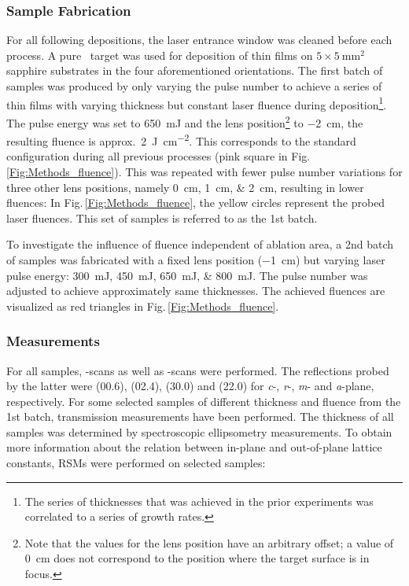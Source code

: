 \subsubsection{Sample Fabrication}
For all following depositions, the laser entrance window was cleaned before each process.
A pure \cro\ target was used for deposition of thin films on $5\times\qty{5}{\mm\squared}$ sapphire substrates in the four aforementioned orientations.
The first batch of samples was produced by only varying the pulse number to achieve a series of thin films with varying thickness but constant laser fluence during deposition\footnote{
    The series of thicknesses that was achieved in the prior experiments was correlated to a series of growth rates.
}.
The pulse energy was set to \qty{650}{\milli\joule} and the lens position\footnote{
    Note that the values for the lens position have an arbitrary offset; a value of \qty{0}{\cm} does not correspond to the position where the target surface is in focus.
}
to \qty{-2}{\cm}, the resulting fluence is approx.\ \qty{2}{\joule\per\cm\squared}.
This corresponds to the standard configuration during all previous processes (pink square in Fig.\,\ref{Fig:Methods_fluence}).
This was repeated with fewer pulse number variations for three other lens positions, namely \qtylist{0;1;2}{\cm}, resulting in lower fluences:
In Fig.\,\ref{Fig:Methods_fluence}, the yellow circles represent the probed laser fluences.
This set of samples is referred to as the 1st batch.

To investigate the influence of fluence independent of ablation area, a 2nd batch of samples was fabricated with a fixed lens position (\qty{-1}{\cm}) but varying laser pulse energy:
\qtylist{300;450;650;800}{\milli\joule}.
The pulse number was adjusted to achieve approximately same thicknesses.
The achieved fluences are visualized as red triangles in Fig.\,\ref{Fig:Methods_fluence}.

\subsubsection{Measurements}
For all samples, \thetaomega-scans as well as \textomega-scans were performed.
The reflections probed by the latter were (00.6), (02.4), (30.0) and (22.0) for \textit{c}-, \textit{r}-, \textit{m}- and \textit{a}-plane, respectively.
For some selected samples of different thickness and fluence from the 1st batch, transmission measurements have been performed.
The thickness of all samples was determined by spectroscopic ellipsometry measurements.
To obtain more information about the relation between in-plane and out-of-plane lattice constants, \glspl{RSM} were performed on selected samples:

